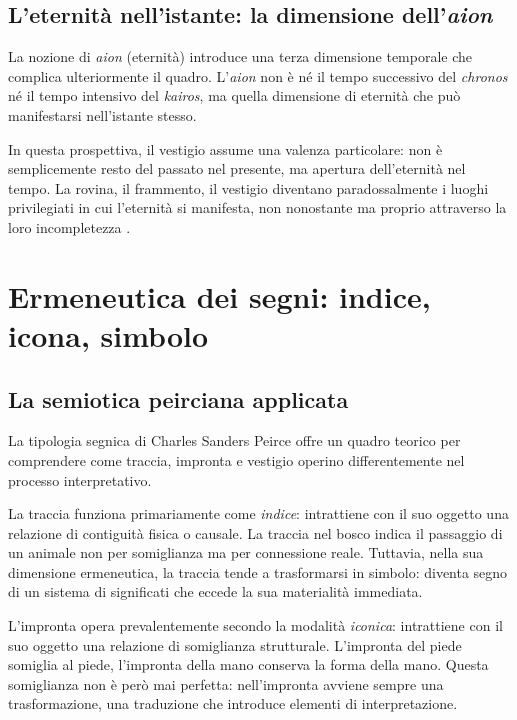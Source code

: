 \documentclass{gs}
\begin{document}
\subsection{L'eternità nell'istante: la dimensione dell'\textit{aion}}

La nozione di \textit{aion} (eternità) introduce una terza dimensione temporale che complica ulteriormente il quadro. L'\textit{aion} non è né il tempo successivo del \textit{chronos} né il tempo intensivo del \textit{kairos}, ma quella dimensione di eternità che può manifestarsi nell'istante stesso.

In questa prospettiva, il vestigio assume una valenza particolare: non è semplicemente resto del passato nel presente, ma apertura dell'eternità nel tempo. La rovina, il frammento, il vestigio diventano paradossalmente i luoghi privilegiati in cui l'eternità si manifesta, non nonostante ma proprio attraverso la loro incompletezza \cite{jankelvitch1957}.

\section{Ermeneutica dei segni: indice, icona, simbolo}

\subsection{La semiotica peirciana applicata}

La tipologia segnica di Charles Sanders Peirce \cite{peirce1931} offre un quadro teorico per comprendere come traccia, impronta e vestigio operino differentemente nel processo interpretativo.

La traccia funziona primariamente come \textit{indice}: intrattiene con il suo oggetto una relazione di contiguità fisica o causale. La traccia nel bosco indica il passaggio di un animale non per somiglianza ma per connessione reale. Tuttavia, nella sua dimensione ermeneutica, la traccia tende a trasformarsi in simbolo: diventa segno di un sistema di significati che eccede la sua materialità immediata.

L'impronta opera prevalentemente secondo la modalità \textit{iconica}: intrattiene con il suo oggetto una relazione di somiglianza strutturale. L'impronta del piede somiglia al piede, l'impronta della mano conserva la forma della mano. Questa somiglianza non è però mai perfetta: nell'impronta avviene sempre una trasformazione, una traduzione che introduce elementi di interpretazione.
\end{document}
